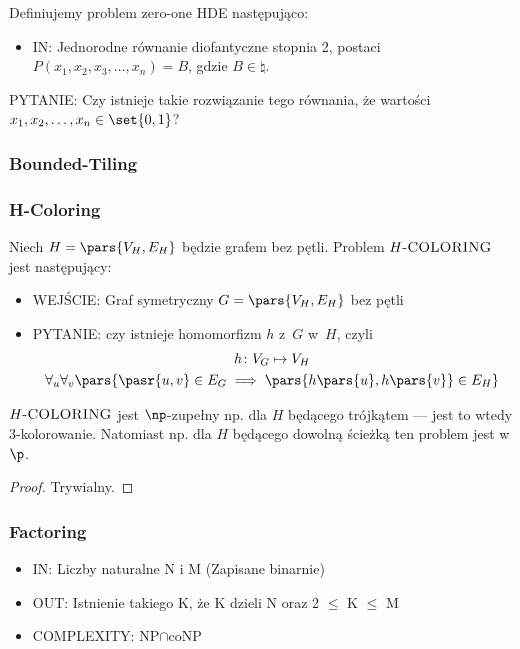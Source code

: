 \begin{definition}
    Definiujemy problem zero-one HDE następująco: 
    
    \begin{itemize}
        \item \textsc{IN:} Jednorodne równanie diofantyczne stopnia 2, postaci \(P(x_1, x_2, x_3, \dots, x_n) = B\), gdzie \(B \in \natural\). 
    \end{itemize}
    \item \textsc{PYTANIE:} Czy istnieje takie rozwiązanie tego równania, że wartości \( x_1, x_2, \dots, x_n \in \set{0,1}\)?  
\end{definition}

\subsubsection{Bounded-Tiling}

\begin{definition}
    
\end{definition}

\subsubsection{H-Coloring}
Niech \(H = \pars{V_H, E_H}\) będzie grafem bez pętli. Problem \(H\textsc{-COLORING}\) jest następujący:
\begin{itemize}
    \item WEJŚCIE: Graf symetryczny \(G = \pars{V_H, E_H}\) bez pętli
    \item PYTANIE: czy istnieje homomorfizm \(h\) z~\(G\) w~\(H\), czyli
        \begin{gather*}
            h\colon V_G \mapsto V_H\\
            \forall_u\forall_v\pars{\pasr{u, v} \in E_G \implies \pars{h\pars{u}, h\pars{v}} \in E_H}
        \end{gather*}
\end{itemize}
\(H\textsc{-COLORING}\) jest \(\np\)-zupełny np. dla \(H\) będącego trójkątem --- jest to wtedy \(3\)-kolorowanie. Natomiast np. dla \(H\) będącego dowolną ścieżką ten problem jest w \(\p\).
\begin{proof}
    Trywialny.
\end{proof}

\subsubsection{Factoring}
    \begin{itemize}
        \item IN: Liczby naturalne N i M (Zapisane binarnie)
        \item OUT: Istnienie takiego K, że K dzieli N oraz 2 \(\le\) K \(\le\) M
        \item COMPLEXITY: NP\(\cap\)coNP
\end{itemize}


